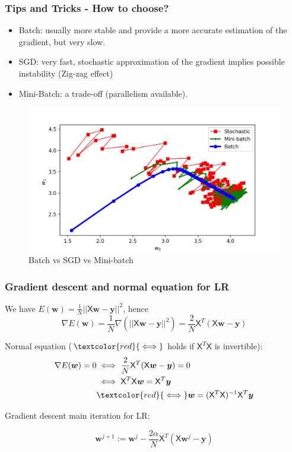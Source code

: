 \documentclass{beamer}
\begin{document}
	\begin{frame}
		\frametitle{Tips and Tricks - How to choose?}
		\begin{itemize}
			\item Batch: usually more stable and provide a more accurate estimation of the gradient, but very slow.
			\item SGD: very fast, stochastic approximation of the gradient implies possible instability (Zig-zag effect)
			\item Mini-Batch: a trade-off (parallelism available).
		\end{itemize}
		\begin{figure}
			\centering
			\includegraphics[scale=0.4]{images/gd_mb_sgd}
			\caption{Batch vs SGD vs Mini-batch}
		\end{figure}
	
	\end{frame}

	\begin{frame}
		\frametitle{Gradient descent and normal equation for LR}
		We have $E(\bm{w}) = \frac{1}{N} ||\mathsf{X}\bm{w} - \bm{y}||^2$, hence
		\begin{equation*}
			\nabla E(\bm{w}) = \frac{1}{N} \nabla (||\mathsf{X}\bm{w} - \bm{y}||^2) = \frac{2}{N}\mathsf{X}^T(\mathsf{X}\bm{w} - \bm{y})
		\end{equation*}
	
	Normal equation ($\textcolor{red}{\iff}$ holds if $\mathsf{X}^T\mathsf{X}$ is invertible):
	\begin{align*}
		\nabla E(\bm{w}) = 0 &\iff \frac{2}{N}\mathsf{X}^T(\mathsf{X}\bm{w} - \bm{y}) = 0\\ 
		&\iff \mathsf{X}^T\mathsf{X}\bm{w} = \mathsf{X}^T\bm{y}\\
		& \textcolor{red}{\iff} \bm{w} = (\mathsf{X}^T\mathsf{X})^{-1}\mathsf{X}^T\bm{y}
	\end{align*}
	
	Gradient descent main iteration for LR:
	
	\begin{equation*}
		\bm{w}^{j+1} := \bm{w}^{j} - \frac{2\alpha}{N}\mathsf{X}^T(\mathsf{X}\bm{w}^j - \bm{y})
	\end{equation*}
	
		
	\end{frame}
\end{document}
